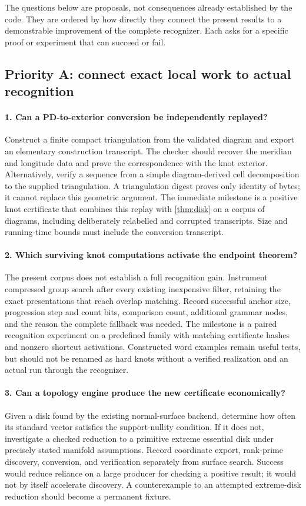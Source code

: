 The questions below are proposals, not consequences already established by
the code. They are ordered by how directly they connect the present results
to a demonstrable improvement of the complete recognizer. Each asks for a
specific proof or experiment that can succeed or fail.

\subsection{Priority A: connect exact local work to actual recognition}

\paragraph{1. Can a PD-to-exterior conversion be independently replayed?}
Construct a finite compact triangulation from the validated diagram and
export an elementary construction transcript. The checker should recover
the meridian and longitude data and prove the correspondence with the knot
exterior. Alternatively, verify a sequence from a simple diagram-derived
cell decomposition to the supplied triangulation. A triangulation digest
proves only identity of bytes; it cannot replace this geometric argument.
The immediate milestone is a positive knot certificate that combines this
replay with \cref{thm:disk} on a corpus of diagrams, including deliberately
relabelled and corrupted transcripts. Size and running-time bounds must
include the conversion transcript.

\paragraph{2. Which surviving knot computations activate the endpoint theorem?}
The present corpus does not establish a full recognition gain. Instrument
compressed group search after every existing inexpensive filter, retaining
the exact presentations that reach overlap matching. Record successful
anchor size, progression step and count bits, comparison count, additional
grammar nodes, and the reason the complete fallback was needed. The
milestone is a paired recognition experiment on a predefined family with
matching certificate hashes and nonzero shortcut activations. Constructed
word examples remain useful tests, but should not be renamed as hard knots
without a verified realization and an actual run through the recognizer.

\paragraph{3. Can a topology engine produce the new certificate economically?}
Given a disk found by the existing normal-surface backend, determine how
often its standard vector satisfies the support-nullity condition. If it
does not, investigate a checked reduction to a primitive extreme essential
disk under precisely stated manifold assumptions. Record coordinate export,
rank-prime discovery, conversion, and verification separately from surface
search. Success would reduce reliance on a large producer for checking a
positive result; it would not by itself accelerate discovery. A counterexample
to an attempted extreme-disk reduction should become a permanent fixture.

